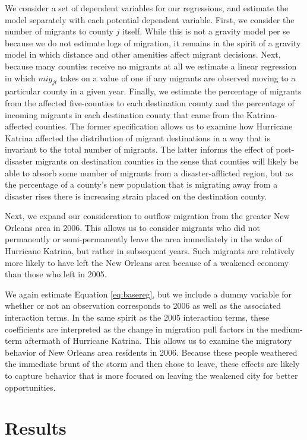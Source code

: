 \documentclass[]{article}
\begin{document}
We consider a set of dependent variables for our regressions, and
estimate the model separately with each potential dependent variable.
First, we consider the number of migrants to county \(j\) itself. While
this is not a gravity model per se because we do not estimate logs of
migration, it remains in the spirit of a gravity model in which distance
and other amenities affect migrant decisions. Next, because many
counties receive no migrants at all we estimate a linear regression in
which \(mig_{jt}\) takes on a value of one if any migrants are observed
moving to a particular county in a given year. Finally, we estimate the
percentage of migrants from the affected five-counties to each
destination county and the percentage of incoming migrants in each
destination county that came from the Katrina-affected counties. The
former specification allows us to examine how Hurricane Katrina affected
the distribution of migrant destinations in a way that is invariant to
the total number of migrants. The latter informs the effect of
post-disaster migrants on destination counties in the sense that
counties will likely be able to absorb some number of migrants from a
disaster-afflicted region, but as the percentage of a county's new
population that is migrating away from a disaster rises there is
increasing strain placed on the destination county.

Next, we expand our consideration to outflow migration from the greater
New Orleans area in 2006. This allows us to consider migrants who did
not permanently or semi-permanently leave the area immediately in the
wake of Hurricane Katrina, but rather in subsequent years. Such migrants
are relatively more likely to have left the New Orleans area because of
a weakened economy than those who left in 2005.

We again estimate Equation \ref{eq:basereg}, but we include a dummy
variable for whether or not an observation corresponds to 2006 as well
as the associated interaction terms. In the same spirit as the 2005
interaction terms, these coefficients are interpreted as the change in
migration pull factors in the medium-term aftermath of Hurricane
Katrina. This allows us to examine the migratory behavior of New Orleans
area residents in 2006. Because these people weathered the immediate
brunt of the storm and then chose to leave, these effects are likely to
capture behavior that is more focused on leaving the weakened city for
better opportunities.

\section{\texorpdfstring{Results
\label{sec:results}}{Results }}\label{results}
\end{document}
